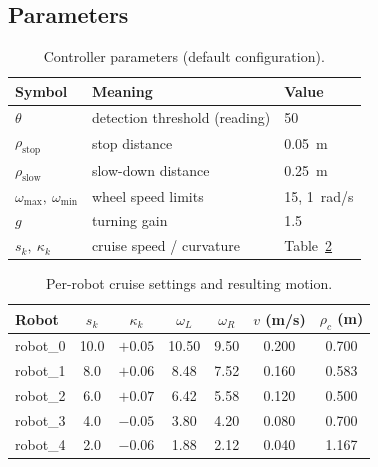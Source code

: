 \documentclass[conference]{IEEEtran}
\begin{document}
\subsection{Parameters}

\begin{table}[t]
    \centering
    \caption{Controller parameters (default configuration).}
    \label{tab:params}
    \begin{tabular}{lll}
        \toprule
        Symbol & Meaning & Value \\
        \midrule
        $\theta$        & detection threshold (reading) & 50 \\
        $\rho_{\text{stop}}$ & stop distance          & \SI{0.05}{m} \\
        $\rho_{\text{slow}}$ & slow-down distance     & \SI{0.25}{m} \\
        $\omega_{\max},\ \omega_{\min}$ & wheel speed limits & 15, 1~rad/s \\
        $g$             & turning gain                   & 1.5 \\
        $s_k,\ \kappa_k$ & cruise speed / curvature      & Table~\ref{tab:cruise} \\
        \bottomrule
    \end{tabular}
\end{table}

\begin{table}[t]
    \centering
    \caption{Per-robot cruise settings and resulting motion.}
    \label{tab:cruise}
    \begin{tabular}{lcccccc}
        \toprule
        Robot & $s_k$ & $\kappa_k$ & $\omega_L$ & $\omega_R$ & $v$ (m/s) & $\rho_c$ (m) \\
        \midrule
        robot\_0 & 10.0 & $+0.05$ & 10.50 & 9.50 & 0.200 & 0.700 \\
        robot\_1 &  8.0 & $+0.06$ &  8.48 & 7.52 & 0.160 & 0.583 \\
        robot\_2 &  6.0 & $+0.07$ &  6.42 & 5.58 & 0.120 & 0.500 \\
        robot\_3 &  4.0 & $-0.05$ &  3.80 & 4.20 & 0.080 & 0.700 \\
        robot\_4 &  2.0 & $-0.06$ &  1.88 & 2.12 & 0.040 & 1.167 \\
        \bottomrule
    \end{tabular}
\end{table}

\end{document}
